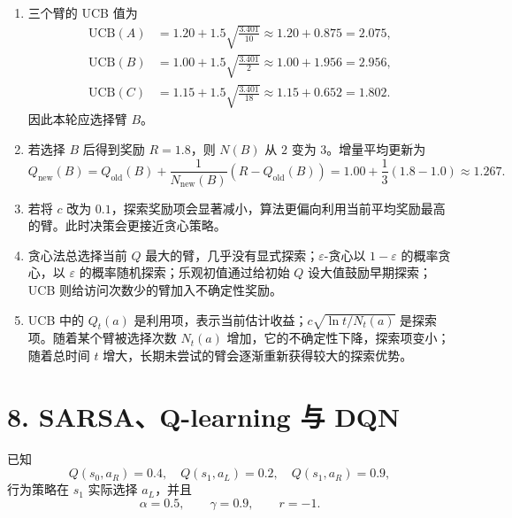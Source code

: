 \documentclass[UTF8,zihao=-4]{ctexart}
\begin{document}
\begin{enumerate}[label=(\arabic*)]
\item 三个臂的 UCB 值为
\[
\begin{aligned}
\mathrm{UCB}(A)&=1.20+1.5\sqrt{\frac{3.401}{10}}\approx 1.20+0.875=2.075,\\
\mathrm{UCB}(B)&=1.00+1.5\sqrt{\frac{3.401}{2}}\approx 1.00+1.956=2.956,\\
\mathrm{UCB}(C)&=1.15+1.5\sqrt{\frac{3.401}{18}}\approx 1.15+0.652=1.802.
\end{aligned}
\]
因此本轮应选择臂 $B$。

\item 若选择 $B$ 后得到奖励 $R=1.8$，则 $N(B)$ 从 $2$ 变为 $3$。增量平均更新为
\[
Q_{\mathrm{new}}(B)
=Q_{\mathrm{old}}(B)+\frac{1}{N_{\mathrm{new}}(B)}(R-Q_{\mathrm{old}}(B))
=1.00+\frac{1}{3}(1.8-1.0)
\approx 1.267.
\]

\item 若将 $c$ 改为 $0.1$，探索奖励项会显著减小，算法更偏向利用当前平均奖励最高的臂。此时决策会更接近贪心策略。

\item 贪心法总选择当前 $Q$ 最大的臂，几乎没有显式探索；$\varepsilon$-贪心以 $1-\varepsilon$ 的概率贪心，以 $\varepsilon$ 的概率随机探索；乐观初值通过给初始 $Q$ 设大值鼓励早期探索；UCB 则给访问次数少的臂加入不确定性奖励。

\item UCB 中的 $Q_t(a)$ 是利用项，表示当前估计收益；$c\sqrt{\ln t/N_t(a)}$ 是探索项。随着某个臂被选择次数 $N_t(a)$ 增加，它的不确定性下降，探索项变小；随着总时间 $t$ 增大，长期未尝试的臂会逐渐重新获得较大的探索优势。
\end{enumerate}

\section*{8. SARSA、Q-learning 与 DQN}

已知
\[
Q(s_0,a_R)=0.4,\quad Q(s_1,a_L)=0.2,\quad Q(s_1,a_R)=0.9,
\]
行为策略在 $s_1$ 实际选择 $a_L$，并且
\[
\alpha=0.5,\qquad \gamma=0.9,\qquad r=-1.
\]
\end{document}
